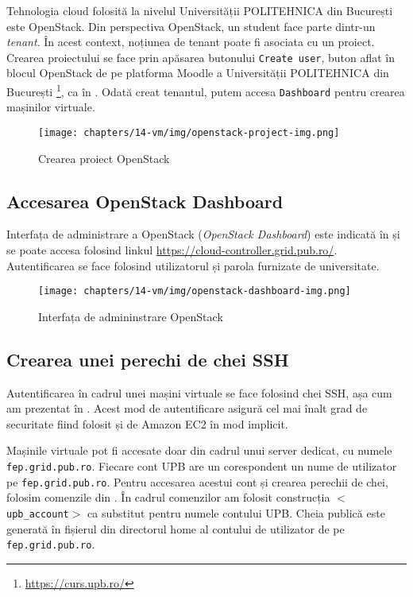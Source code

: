 Tehnologia cloud folosită la nivelul Universității POLITEHNICA din București este OpenStack.
Din perspectiva OpenStack, un student face parte dintr-un \textit{tenant}.
În acest context, noțiunea de tenant poate fi asociata cu un
proiect. Crearea proiectului se face prin apăsarea butonului \texttt{Create user}, buton
aflat în blocul OpenStack de pe platforma Moodle a Universității POLITEHNICA din București
\footnote{\url{https://curs.upb.ro/}}, ca în . Odată
creat tenantul, putem accesa \texttt{Dashboard} pentru crearea mașinilor virtuale.

\begin{figure}[!htbp]
	\centering
	\texttt{[image: chapters/14-vm/img/openstack-project-img.png]}
	\caption{Crearea proiect OpenStack}
	\label{fig:vm:openstack-project}
\end{figure}

\subsection{Accesarea OpenStack Dashboard}
\label{sec:vm:upb-openstack:dashboard}

Interfața de administrare a OpenStack (\textit{OpenStack Dashboard}) este indicată în  și se poate accesa
folosind linkul \url{https://cloud-controller.grid.pub.ro/}. Autentificarea se face
folosind utilizatorul și parola furnizate de universitate.

\begin{figure}[!htbp]
	\centering
	\texttt{[image: chapters/14-vm/img/openstack-dashboard-img.png]}
	\caption{Interfața de admininstrare OpenStack}
	\label{fig:vm:openstack-dashboard}
\end{figure}

\subsection{Crearea unei perechi de chei SSH}
\label{sec:vm:upb-openstack:keys}

Autentificarea în cadrul unei mașini virtuale se face folosind chei SSH, așa cum am prezentat în . Acest mod de autentificare asigură cel mai înalt grad de securitate fiind folosit și de Amazon EC2 în mod implicit.

Mașinile virtuale pot fi accesate doar din cadrul unui server dedicat, cu numele \texttt{fep.grid.pub.ro}.
Fiecare cont UPB are un corespondent un nume de utilizator pe \texttt{fep.grid.pub.ro}.
Pentru accesarea acestui cont și crearea perechii de chei, folosim comenzile din .
În cadrul comenzilor am folosit construcția \texttt{$<$upb\_account$>$} ca substitut pentru numele contului UPB.
Cheia publică este generată în fișierul  din directorul home al contului de utilizator de pe \texttt{fep.grid.pub.ro}.

